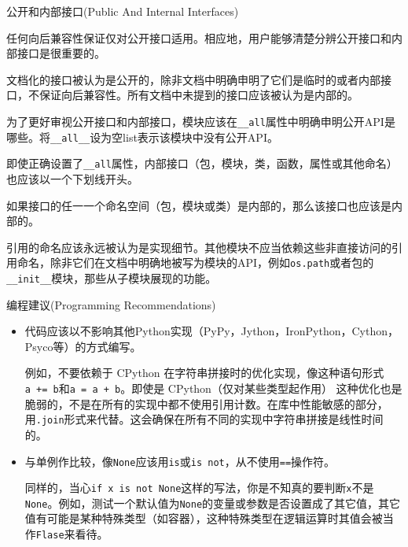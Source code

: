 \documentclass[ignorenonframetext,9pt]{beamer}
\begin{document}
\begin{frame}[fragile]

\begin{block}{公开和内部接口(Public And Internal Interfaces)}

任何向后兼容性保证仅对公开接口适用。相应地，用户能够清楚分辨公开接口和内部接口是很重要的。

文档化的接口被认为是公开的，除非文档中明确申明了它们是临时的或者内部接口，不保证向后兼容性。所有文档中未提到的接口应该被认为是内部的。

为了更好审视公开接口和内部接口，模块应该在\texttt{\_\_all}属性中明确申明公开API是哪些。将\texttt{\_\_all\_\_}设为空list表示该模块中没有公开API。

即使正确设置了\texttt{\_\_all}属性，内部接口（包，模块，类，函数，属性或其他命名）也应该以一个下划线开头。

如果接口的任一一个命名空间（包，模块或类）是内部的，那么该接口也应该是内部的。

引用的命名应该永远被认为是实现细节。其他模块不应当依赖这些非直接访问的引用命名，除非它们在文档中明确地被写为模块的API，例如\texttt{os.path}或者包的\texttt{\_\_init\_\_}模块，那些从子模块展现的功能。

\end{block}

\end{frame}

\begin{frame}[fragile]{编程建议(Programming Recommendations)}
\protect\hypertarget{ux7f16ux7a0bux5efaux8baeprogramming-recommendations}{}

\begin{itemize}
\item
  代码应该以不影响其他Python实现（PyPy，Jython，IronPython，Cython，Psyco等）的方式编写。

  例如，不要依赖于 CPython
  在字符串拼接时的优化实现，像这种语句形式\texttt{a\ +=\ b}和\texttt{a\ =\ a\ +\ b}。即使是
  CPython（仅对某些类型起作用）
  这种优化也是脆弱的，不是在所有的实现中都不使用引用计数。在库中性能敏感的部分，用\texttt{\textquotesingle{}\textquotesingle{}.join}形式来代替。这会确保在所有不同的实现中字符串拼接是线性时间的。
\item
  与单例作比较，像\texttt{None}应该用\texttt{is}或\texttt{is\ not}，从不使用\texttt{==}操作符。

  同样的，当心\texttt{if\ x\ is\ not\ None}这样的写法，你是不知真的要判断\texttt{x}不是\texttt{None}。例如，测试一个默认值为\texttt{None}的变量或参数是否设置成了其它值，其它值有可能是某种特殊类型（如容器），这种特殊类型在逻辑运算时其值会被当作\texttt{Flase}来看待。
\end{itemize}

\end{frame}
\end{document}
